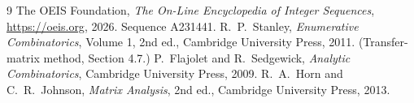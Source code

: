 \documentclass[11pt,a4paper]{article}
\theoremstyle{plain}
\theoremstyle{definition}
\begin{document}
\begin{thebibliography}{9}
 The OEIS Foundation, \emph{The On-Line Encyclopedia of Integer
Sequences}, \url{https://oeis.org}, 2026. Sequence A231441.
 R.~P.~Stanley, \emph{Enumerative Combinatorics}, Volume 1, 2nd ed.,
Cambridge University Press, 2011. (Transfer-matrix method, Section 4.7.)
 P.~Flajolet and R.~Sedgewick, \emph{Analytic Combinatorics}, Cambridge
University Press, 2009.
 R.~A.~Horn and C.~R.~Johnson, \emph{Matrix Analysis}, 2nd ed., Cambridge
University Press, 2013.
\end{thebibliography}
\end{document}
